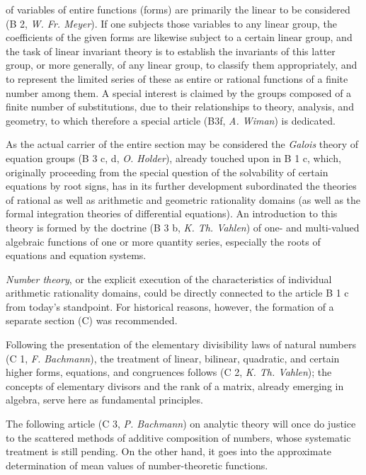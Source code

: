 \thispagestyle{fancy}

\vspace{0.5cm}

of variables of entire functions (forms) are primarily the linear to be considered (B 2, \textit{W. Fr. Meyer}). If one subjects those variables to any linear group, the coefficients of the given forms are likewise subject to a certain linear group, and the task of linear invariant theory is to establish the invariants of this latter group, or more generally, of any linear group, to classify them appropriately, and to represent the limited series of these as entire or rational functions of a finite number among them. A special interest is claimed by the groups composed of a finite number of substitutions, due to their relationships to theory, analysis, and geometry, to which therefore a special article (B3f, \textit{A. Wiman}) is dedicated.

As the actual carrier of the entire section may be considered the \textit{Galois} theory of equation groups (B 3 c, d, \textit{O. Holder}), already touched upon in B 1 c, which, originally proceeding from the special question of the solvability of certain equations by root signs, has in its further development subordinated the theories of rational as well as arithmetic and geometric rationality domains (as well as the formal integration theories of differential equations). An introduction to this theory is formed by the doctrine (B 3 b, \textit{K. Th. Vahlen}) of one- and multi-valued algebraic functions of one or more quantity series, especially the roots of equations and equation systems.

\textit{Number theory}, or the explicit execution of the characteristics of individual arithmetic rationality domains, could be directly connected to the article B 1 c from today's standpoint. For historical reasons, however, the formation of a separate section (C) was recommended.

Following the presentation of the elementary divisibility laws of natural numbers (C 1, \textit{F. Bachmann}), the treatment of linear, bilinear, quadratic, and certain higher forms, equations, and congruences follows (C 2, \textit{K. Th. Vahlen}); the concepts of elementary divisors and the rank of a matrix, already emerging in algebra, serve here as fundamental principles.

The following article (C 3, \textit{P. Bachmann}) on analytic theory will once do justice to the scattered methods of additive composition of numbers, whose systematic treatment is still pending. On the other hand, it goes into the approximate determination of mean values of number-theoretic functions.
